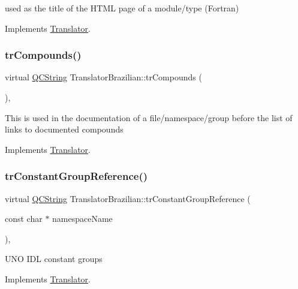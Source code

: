 used as the title of the H\+T\+ML page of a module/type (Fortran) 

Implements \mbox{\hyperlink{class_translator}{Translator}}.

\mbox{\label{class_translator_brazilian_a9cc45d726696646119bc3ad9639128c8}} 
\subsubsection{\texorpdfstring{trCompounds()}{trCompounds()}}
{\footnotesize\ttfamily virtual \mbox{\hyperlink{class_q_c_string}{Q\+C\+String}} Translator\+Brazilian\+::tr\+Compounds (\begin{DoxyParamCaption}{ }\end{DoxyParamCaption})\hspace{0.3cm}{\ttfamily [inline]}, {\ttfamily [virtual]}}

This is used in the documentation of a file/namespace/group before the list of links to documented compounds 

Implements \mbox{\hyperlink{class_translator}{Translator}}.

\mbox{\label{class_translator_brazilian_a539c22bdd139b9d7b602726e8e8f51ed}} 
\subsubsection{\texorpdfstring{trConstantGroupReference()}{trConstantGroupReference()}}
{\footnotesize\ttfamily virtual \mbox{\hyperlink{class_q_c_string}{Q\+C\+String}} Translator\+Brazilian\+::tr\+Constant\+Group\+Reference (\begin{DoxyParamCaption}\item[{const char $\ast$}]{namespace\+Name }\end{DoxyParamCaption})\hspace{0.3cm}{\ttfamily [inline]}, {\ttfamily [virtual]}}

U\+NO I\+DL constant groups 

Implements \mbox{\hyperlink{class_translator}{Translator}}.

